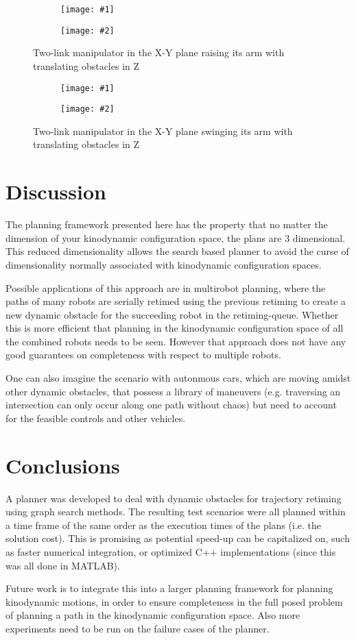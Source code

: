 \documentclass[letterpaper,12pt]{article} %
\newcommand{\ffigdouble}[4]{
    \begin{figure}[h!]
    \centering

    \begin{subfigure}[t!]{0.48\linewidth}
    \texttt{[image: \#1]}
    \caption{}
    \label{fig:#4L}
    \end{subfigure}
    \begin{subfigure}[b!]{0.48\linewidth}
    \texttt{[image: \#2]}
    \caption{}
    \label{fig:#4R}
    \end{subfigure}

    \caption{#3}
    \label{fig:#4}
    \end{figure}
}
\begin{document}
\ffigdouble{pics/raise1}{pics/raise2}{Two-link manipulator in the X-Y plane raising its arm with translating obstacles in Z}{raisearm}
\ffigdouble{pics/swing1}{pics/swing2}{Two-link manipulator in the X-Y plane swinging its arm with translating obstacles in Z}{swingarm}

\section{Discussion}

The planning framework presented here has the property that no matter the dimension of your kinodynamic configuration space, the plans are 3 dimensional. This reduced dimensionality allows the search based planner to avoid the curse of dimensionality normally associated with kinodynamic configuration spaces.

Possible applications of this approach are in multirobot planning, where the paths of many robots are serially retimed using the previous retiming to create a new dynamic obstacle for the succeeding robot in the retiming-queue. Whether this is more efficient that planning in the kinodynamic configuration space of all the combined robots needs to be seen. However that approach does not have any good guarantees on completeness with respect to multiple robots.

One can also imagine the scenario with autonmous cars, which are moving amidst other dynamic obstacles, that possess a library of maneuvers (e.g. traversing an intersection can only occur along one path without chaos) but need to account for the feasible controls and other vehicles.

\section{Conclusions}

A planner was developed to deal with dynamic obstacles for trajectory retiming using graph search methods. The resulting test scenarios were all planned within a time frame of the same order as the execution times of the plans (i.e. the solution cost). This is promising as potential speed-up can be capitalized on, such as faster numerical integration, or optimized C++ implementations (since this was all done in MATLAB).

Future work is to integrate this into a larger planning framework for planning kinodynamic motions, in order to ensure completeness in the full posed problem of planning a path in the kinodynamic configuration space. Also more experiments need to be run on the failure cases of the planner.
\end{document}
